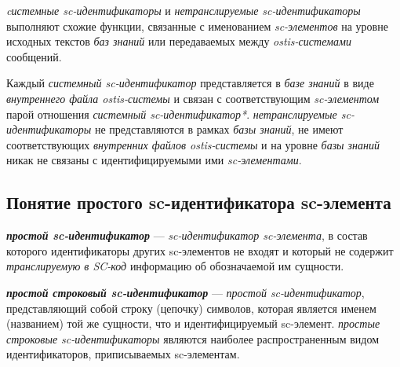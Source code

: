 \textit{cистемные sc-идентификаторы} и \textit{нетранслируемые sc-идентификаторы} выполняют схожие функции, связанные с именованием \textit{sc-элементов} на уровне исходных текстов \textit{баз знаний} или передаваемых между \textit{ostis-системами} сообщений.

Каждый \textit{системный sc-идентификатор} представляется в \textit{базе знаний} в виде \textit{внутреннего файла ostis-системы} и связан с соответствующим \textit{sc-элементом} парой отношения \textit{системный \mbox{sc-идентификатор*}}. \textit{нетранслируемые sc-идентификаторы} не представляются в рамках \textit{базы знаний}, не имеют соответствующих \textit{внутренних файлов ostis-системы} и на уровне \textit{базы знаний} никак не связаны с идентифицируемыми ими \textit{sc-элементами}.

\subsection{Понятие простого sc-идентификатора sc-элемента}
\label{sec_simple_identifier_concept}

\textbf{\textit{простой sc-идентификатор}} --- \textit{sc-идентификатор sc-элемента}, в состав которого идентификаторы других sc-элементов не входят и который не содержит \textit{транслируемую в SC-код} информацию об обозначаемой им сущности. 

\textbf{\textit{простой строковый sc-идентификатор}} --- \textit{простой sc-идентификатор}, представляющий собой строку (цепочку) символов, которая является именем (названием) той же сущности, что и идентифицируемый sc-элемент. \textit{простые строковые sc-идентификаторы} являются наиболее распространенным видом идентификаторов, приписываемых sc-элементам.

